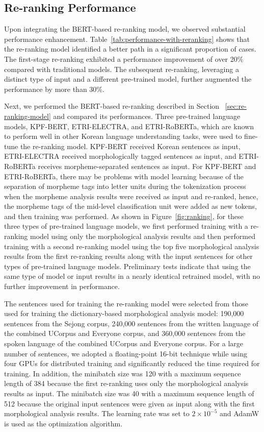 \documentclass[AMS,STIX2COL]{WileyNJD-v2}
\begin{document}
    \subsection{Re-ranking Performance}\label{subsec5.4}

    Upon integrating the BERT-based re-ranking model, we observed substantial performance enhancement. Table~\ref{tab:performance-with-reranking} shows that the re-ranking model identified a better path in a significant proportion of cases. The first-stage re-ranking exhibited a performance improvement of over 20\% compared with traditional models. The subsequent re-ranking, leveraging a distinct type of input and a different pre-trained model, further augmented the performance by more than 30\%.

    Next, we performed the BERT-based re-ranking described in Section ~\ref{sec:re-ranking-model} and compared its performances.
    Three pre-trained language models, KPF-BERT, ETRI-ELECTRA, and ETRI-RoBERTa, which are known to perform well in other Korean language understanding tasks, were used to fine-tune the re-ranking model. KPF-BERT received Korean sentences as input, ETRI-ELECTRA received morphologically tagged sentences as input, and ETRI-RoBERTa receives morpheme-separated sentences as input. For KPF-BERT and ETRI-RoBERTa, there may be problems with model learning because of the separation of morpheme tags into letter units during the tokenization process when the morpheme analysis results were received as input and re-ranked, hence, the morpheme tags of the mid-level classification unit were added as new tokens, and then training was performed.
    As shown in Figure~\ref{fig:ranking}, for these three types of pre-trained language models, we first performed training with a re-ranking model using only the morphological analysis results and then performed training with a second re-ranking model using the top five morphological analysis results from the first re-ranking results along with the input sentences for other types of pre-trained language models. Preliminary tests indicate that using the same type of model or input results in a nearly identical retrained model, with no further improvement in performance.

    The sentences used for training the re-ranking model were selected from those used for training the dictionary-based morphological analysis model: 190,000 sentences from the Sejong corpus, 240,000 sentences from the written language of the combined UCorpus and Everyone corpus, and 360,000 sentences from the spoken language of the combined UCorpus and Everyone corpus. For a large number of sentences, we adopted a floating-point 16-bit technique while using four GPUs for distributed training and significantly reduced the time required for training.
    In addition, the minibatch size was 120 with a maximum sequence length of 384 because the first re-ranking uses only the morphological analysis results as input. The minibatch size was 40 with a maximum sequence length of 512 because the original input sentences were given as input along with the first morphological analysis results. The learning rate was set to $2 \times 10^{-5}$ and AdamW is used as the optimization algorithm.
\end{document}
